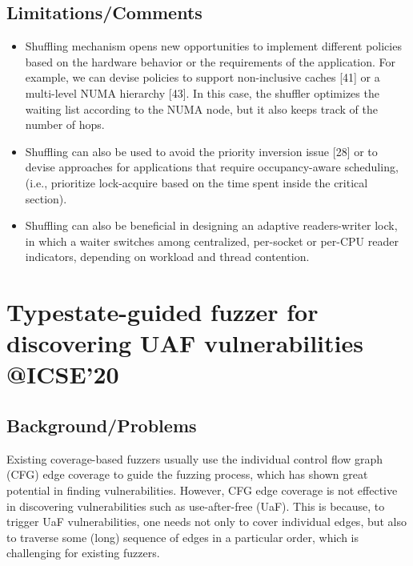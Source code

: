 \subsection{Limitations/Comments}
\begin{itemize}
\item Shuffling mechanism opens new opportunities to implement different policies based on the hardware behavior or the requirements of the application. For example, we can devise policies to support non-inclusive caches [41] or a multi-level NUMA hierarchy [43]. In this case, the shuffler optimizes the waiting list according to the NUMA node, but it also keeps track of the number of hops. 
\item Shuffling can also be used to avoid the priority inversion issue [28] or to devise approaches for applications that require occupancy-aware scheduling, (i.e., prioritize lock-acquire based on the time spent inside the critical section). 
\item Shuffling can also be beneficial in designing an adaptive readers-writer lock, in which a waiter switches among centralized, per-socket or per-CPU reader indicators, depending on workload and thread contention.
\end{itemize}
\newpage
\section{Typestate-guided fuzzer for discovering UAF vulnerabilities \\@ICSE'20}
\subsection{Background/Problems}
Existing coverage-based fuzzers usually use the individual control flow graph (CFG) edge coverage to guide the fuzzing process, which has shown great potential in finding vulnerabilities. However, CFG edge coverage is not effective in discovering vulnerabilities such as use-after-free (UaF). This is because, to trigger UaF vulnerabilities, one needs not only to cover individual edges, but also to traverse some (long) sequence of edges in a particular order, which is challenging for existing fuzzers.
